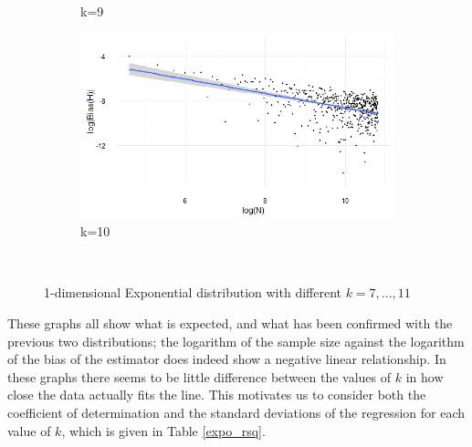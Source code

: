 \documentclass[12pt]{report}
\begin{document}
\begin{figure}
{\begin{subfigure}[b]{.6\textwidth}
\caption{k=9}
\end{subfigure}%
\begin{subfigure}[b]{.6\textwidth}
\centering
\includegraphics[width=\textwidth]{./Graphs/Best/Expo_k=10.png}
\caption{k=10}
\end{subfigure}%
}\    
\caption{1-dimensional Exponential distribution with different $k = 7, ..., 11 $} \label{Expo_graphs711}
\end{figure}

These graphs all show what is expected, and what has been confirmed with the previous two distributions; the logarithm of the sample size against the logarithm of the bias of the estimator does indeed show a negative linear relationship. In these graphs there seems to be little difference between the values of $k$ in how close the data actually fits the line. This motivates us to consider both the coefficient of determination and the standard deviations of the regression for each value of $k$, which is given in Table \ref{expo_rsq}.
\end{document}
